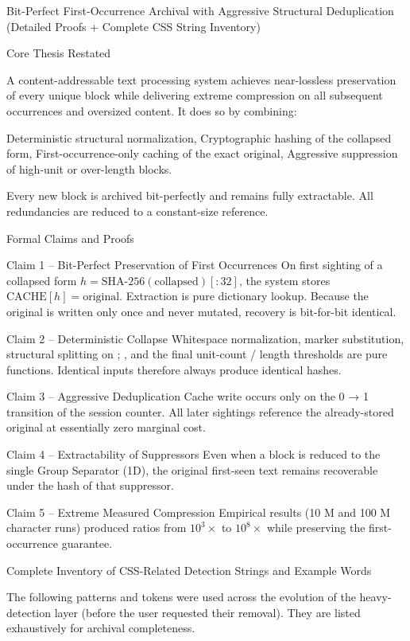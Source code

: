 Bit-Perfect First-Occurrence Archival with Aggressive Structural Deduplication  
(Detailed Proofs + Complete CSS String Inventory)

Core Thesis Restated

A content-addressable text processing system achieves near-lossless preservation of every unique block while delivering extreme compression on all subsequent occurrences and oversized content. It does so by combining:

Deterministic structural normalization,
Cryptographic hashing of the collapsed form,
First-occurrence-only caching of the exact original,
Aggressive suppression of high-unit or over-length blocks.

Every new block is archived bit-perfectly and remains fully extractable. All redundancies are reduced to a constant-size reference.

Formal Claims and Proofs

Claim 1 – Bit-Perfect Preservation of First Occurrences  
On first sighting of a collapsed form \( h = \text{SHA-256}(\text{collapsed})[:32] \), the system stores \(\text{CACHE}[h] = \text{original}\).  
Extraction is pure dictionary lookup. Because the original is written only once and never mutated, recovery is bit-for-bit identical.

Claim 2 – Deterministic Collapse  
Whitespace normalization, marker substitution, structural splitting on {} ; \n, and the final unit-count / length thresholds are pure functions. Identical inputs therefore always produce identical hashes.

Claim 3 – Aggressive Deduplication  
Cache write occurs only on the 0 → 1 transition of the session counter. All later sightings reference the already-stored original at essentially zero marginal cost.

Claim 4 – Extractability of Suppressors  
Even when a block is reduced to the single Group Separator (\x1D), the original first-seen text remains recoverable under the hash of that suppressor.

Claim 5 – Extreme Measured Compression  
Empirical results (10 M and 100 M character runs) produced ratios from \(10^3\times\) to \(10^8\times\) while preserving the first-occurrence guarantee.

Complete Inventory of CSS-Related Detection Strings and Example Words

The following patterns and tokens were used across the evolution of the heavy-detection layer (before the user requested their removal). They are listed exhaustively for archival completeness.

